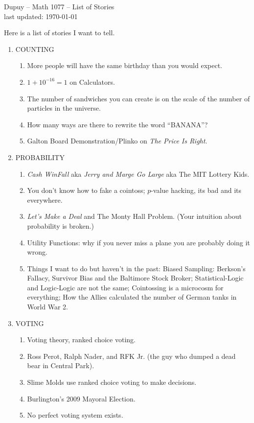\documentclass[]{article}
\numberwithin{equation}{section}
\theoremstyle{definition}
\theoremstyle{remark}
\begin{document}
	
	\begin{center}
		{\Large \sc Dupuy -- Math 1077  -- List of Stories  }\\
		last updated: \today
	\end{center}

Here is a list of stories I want to tell. 
\begin{enumerate}
	\item COUNTING 
	\begin{enumerate}
		\item More people will have the same birthday than you would expect.
		\item $1+10^{-16}=1$ on Calculators.
		\item The number of sandwiches you can create is on the scale of the number of particles in the universe.
		\item How many ways are there to rewrite the word ``BANANA''?
		\item Galton Board Demonstration/Plinko on \emph{The Price Is Right}.
	\end{enumerate}
	
	
	\item PROBABILITY 
	\begin{enumerate}
		\item \emph{Cash WinFall} aka \emph{Jerry and Marge Go Large} aka The MIT Lottery Kids.
		\item You don't know how to fake a cointoss; $p$-value hacking, its bad and its everywhere.
		\item \emph{Let's Make a Deal} and The Monty Hall Problem. (Your intuition about probability is broken.)
		\item Utility Functions: why if you never miss a plane you are probably doing it wrong.
		\item Things I want to do but haven't in the past: 	Biased Sampling: Berkson's Fallacy, Survivor Bias and the Baltimore Stock Broker; Statistical-Logic and Logic-Logic are not the same; Cointossing is a microcosm for everything;  How the Allies calculated the number of German tanks in World War 2. 
	\end{enumerate}
\item VOTING
\begin{enumerate}
	\item Voting theory, ranked choice voting.
	\item Ross Perot, Ralph Nader, and RFK Jr. (the guy who dumped a dead bear in Central Park).
	\item Slime Molds use ranked choice voting to make decisions.
	\item Burlington's 2009 Mayoral Election.
	\item No perfect voting system exists.
\end{enumerate}


\end{enumerate}
\end{document}

